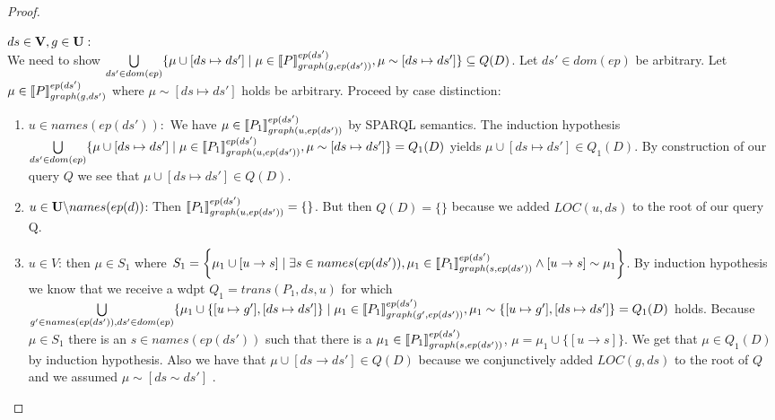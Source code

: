 \begin{proof}
\begin{enumerate}
		\bigskip\noindent
		$ds \in \mathbf{V}, g \in \mathbf{U}:$ \\
		We need to show 
		$\bigcup\limits_{ds' \in dom(ep)} \{ \mu \cup [ds \mapsto ds'] \mid \mu \in
			\llbracket P\rrbracket^{ep(ds')}_{graph(g,ep(ds'))}, \mu \sim
		[ds\mapsto ds'] \}  \subseteq Q(D)$.
		Let $ds' \in dom(ep)$ be arbitrary.
		Let $\mu \in \llbracket P \rrbracket^{ep(ds')}_{graph(g,ds')}$ where 
		$\mu \sim [ds \mapsto ds']$ holds be arbitrary.
		Proceed by case distinction:
		\begin{enumerate}
			\item $u \in names(ep(ds')):$ We have $\mu \in \llbracket P_1
				\rrbracket^{ep(ds')}_{graph(u,ep(ds'))}$ by SPARQL semantics. The
				induction hypothesis $\bigcup\limits_{ds' \in dom(ep)} \{ \mu \cup [ds \mapsto ds'] \mid \mu \in
					\llbracket P_1 \rrbracket^{ep(ds')}_{graph(u,ep(ds'))}, \mu \sim
				[ds\mapsto ds'] \}  = Q_1(D)$ yields $\mu\cup [ds\mapsto ds'] \in Q_1(D)$. 
				By construction of our query $Q$ we see that $\mu \cup [ds\mapsto ds'] \in Q(D)$.
			\item $u \in \mathbf{U} \backslash names(ep(d))$:
				Then $\llbracket P_1 \rrbracket^{ep(ds')}_{graph(u,ep(ds'))} = \{\}$. But then
				$Q(D) = \{\}$ because we added $LOC(u,ds)$ to the root of our
				query Q.
			\item $u \in V$:
				then $\mu \in S_1$ where $S_1 =  \bigg\{\mu_1 \cup [ u \rightarrow s ] \mid
					\exists s \in names(ep(ds')),\\ \mu_1 \in \llbracket P_1
					\rrbracket^{ep(ds')}_{graph(s,ep(ds'))} \land [ u \rightarrow s ] \sim
				\mu_1 \bigg\}$. 
				By induction hypothesis we know that we receive a wdpt $Q_1
				= trans(P_1,ds,u)$ for which \\
				$\bigcup\limits_{g'\in names(ep(ds')),ds' \in dom(ep)} \{ \mu_1 \cup
					\{[u\mapsto g'],[ds \mapsto ds']\} \mid\\
					\mu_1 \in \llbracket P_1 \rrbracket^{ep(ds')}_{graph(g',ep(ds'))}, \mu_1 \sim
					\{[u \mapsto g'], [ds \mapsto ds']\} = Q_1(D)$ holds. 
					Because $\mu \in S_1$ there	is an $s \in names(ep(ds'))$ such
					that there is a $\mu_1 \in \llbracket P_1
					\rrbracket^{ep(ds')}_{graph(s,ep(ds'))}$,
					$\mu = \mu_1 \cup \{[u \rightarrow
					s]\}$. We get that $\mu \in Q_1(D)$ by induction hypothesis.
					Also we have that $\mu \cup [ds \rightarrow ds'] \in Q(D)$
					because we conjunctively added $LOC(g,ds)$ to the root of $Q$ and we
					assumed $\mu \sim [ds \sim ds']$ .
			\end{enumerate}


\end{enumerate}
\end{proof}
